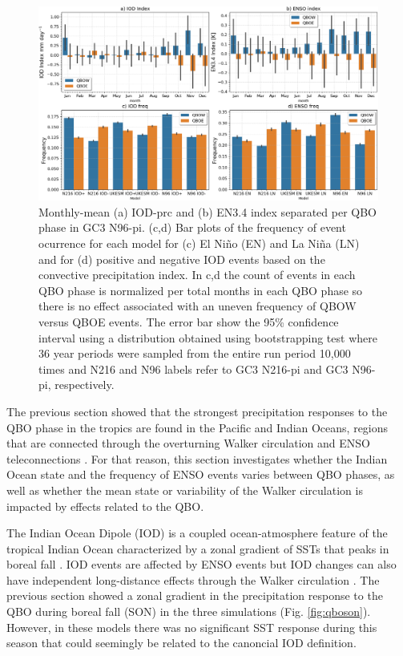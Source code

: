 \begin{figure}[b!]
\centering
 \noindent
 \includegraphics[width=\linewidth]{figures/iod_barplot.png}
\caption[IOD and ENSO frequency changes on QBO phase.]{ Monthly-mean (a) IOD-prc and (b) EN3.4 index separated per QBO phase in GC3 N96-pi. (c,d) Bar plots of the frequency of event ocurrence for each model for (c) El Niño (EN) and La Niña (LN) and for (d) positive and negative IOD events based on the convective precipitation index. In c,d the count of events in each QBO phase is normalized per total months in each QBO phase  so there is no effect associated with an uneven frequency of QBOW versus QBOE events. The error bar show the 95\% confidence interval using a distribution obtained using bootstrapping test where 36 year periods were sampled from the entire run period  10,000 times  and N216 and N96 labels refer to GC3 N216-pi and GC3 N96-pi, respectively.}
\label{fig:iod_barplot}
\end{figure}

The previous section showed that the strongest precipitation responses to the QBO phase in the tropics are found in the Pacific and Indian Oceans, regions that are connected through the overturning Walker circulation and ENSO teleconnections \citep{cai2019pantropical}. For that reason, this section investigates whether the Indian Ocean state and the frequency of ENSO events varies between QBO phases, as well as whether the mean state or variability of the Walker circulation is impacted by effects related to the QBO. 

The Indian Ocean Dipole (IOD) is a coupled ocean-atmosphere feature of the tropical Indian Ocean characterized by a zonal gradient of SSTs that peaks in boreal fall \citep{saji1999iod,wang2014iod,mckenna2020iod}. IOD events are affected by ENSO events but IOD changes can also have independent long-distance effects through the Walker circulation \citep{wang2014iod}. The previous section showed a zonal gradient in the precipitation response to the QBO during boreal fall (SON) in the three simulations (Fig. \ref{fig:qboson}). However, in these models there was no significant SST response during this season that could seemingly be related to the canoncial IOD definition.

